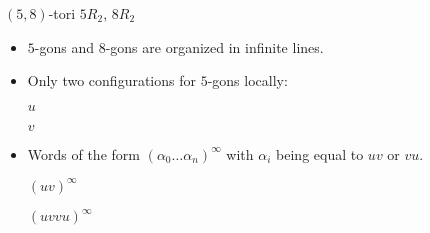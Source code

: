 \documentclass[%
pdf,
colorBG,
slideColor,
]{prosper}
\begin{document}
\begin{slide}{$(5,8)$-tori $5R_2$, $8R_2$}
\begin{itemize}
\item $5$-gons and $8$-gons are organized in infinite lines.
\item Only two configurations for $5$-gons locally:
\begin{center}
\begin{minipage}{5.2cm}
\centering
{}\par
$u$
\end{minipage}
\begin{minipage}{5.2cm}
\centering
{}\par
$v$
\end{minipage}
\end{center}
\item Words of the form $(\alpha_0\dots\alpha_n)^{\infty}$ with $\alpha_i$ being equal to $uv$ or $vu$.
\begin{center}
\begin{minipage}{5.2cm}
\centering
{}\par
$(uv)^{\infty}$
\end{minipage}
\begin{minipage}{5.2cm}
\centering
{}\par
$(uvvu)^{\infty}$
\end{minipage}
\end{center}


\end{itemize}
\end{slide}
\end{document}
